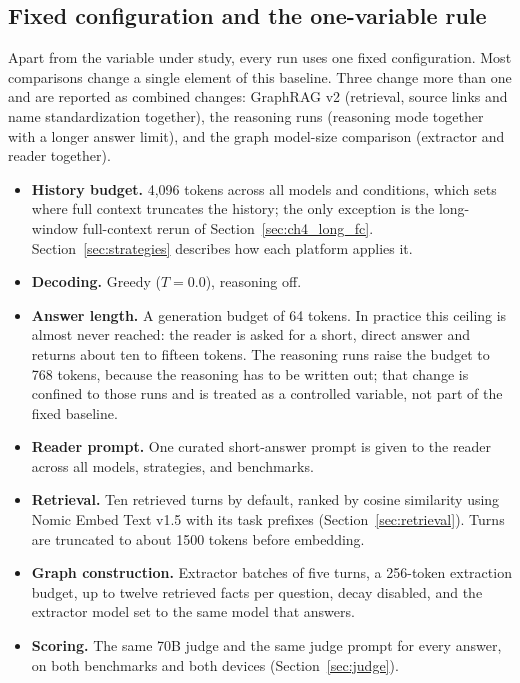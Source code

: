 \subsection{Fixed configuration and the one-variable rule}
\label{sec:config}

Apart from the variable under study, every run uses one fixed configuration. Most comparisons change a
single element of this baseline. Three change more than one and are reported as combined changes:
GraphRAG v2 (retrieval, source links and name standardization together), the reasoning runs (reasoning
mode together with a longer answer limit), and the graph model-size comparison (extractor and reader
together).

\begin{itemize}
  \item \textbf{History budget.} 4,096 tokens across all models and conditions, which sets where
        full context truncates the history; the only exception is the long-window full-context
        rerun of Section~\ref{sec:ch4_long_fc}. Section~\ref{sec:strategies} describes how each platform
        applies it.
  \item \textbf{Decoding.} Greedy ($T=0.0$), reasoning off.
  \item \textbf{Answer length.} A generation budget of 64 tokens. In practice this ceiling is almost
        never reached: the reader is asked for a short, direct answer and returns about ten to
        fifteen tokens. The reasoning runs raise the budget to 768 tokens, because the reasoning has
        to be written out; that change is confined to those runs and is treated as a controlled
        variable, not part of the fixed baseline.
  \item \textbf{Reader prompt.} One curated short-answer prompt is given to the reader across all
        models, strategies, and benchmarks.
  \item \textbf{Retrieval.} Ten retrieved turns by default, ranked by cosine similarity using Nomic
        Embed Text v1.5 with its task prefixes (Section~\ref{sec:retrieval}). Turns are truncated to
        about 1500 tokens before embedding.
  \item \textbf{Graph construction.} Extractor batches of five turns, a 256-token extraction budget,
        up to twelve retrieved facts per question, decay disabled, and the extractor model set to the
        same model that answers.
  \item \textbf{Scoring.} The same 70B judge and the same judge prompt for every answer, on both
        benchmarks and both devices (Section~\ref{sec:judge}).
\end{itemize}

